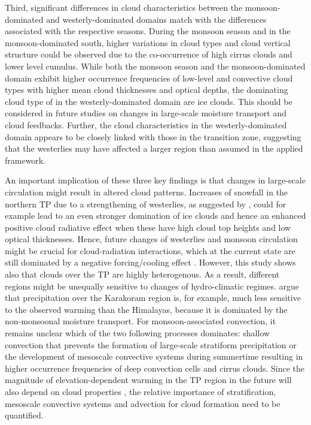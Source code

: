 \documentclass[alpha-refs]{wiley-article}
\begin{document}
Third, significant differences in cloud characteristics between the monsoon-dominated and westerly-dominated domains match with the differences associated with the respective seasons. During the monsoon season and in the monsoon-dominated south, higher variations in cloud types and cloud vertical structure could be observed due to the co-occurrence of high cirrus clouds and lower level cumulus. While both the monsoon season and the monsoon-dominated domain exhibit higher occurrence frequencies of low-level and convective cloud types with higher mean cloud thicknesses and optical depths, the dominating cloud type of in the westerly-dominated domain are ice clouds. This should be considered in future studies on changes in large-scale moisture transport and cloud feedbacks. Further, the cloud characteristics in the westerly-dominated domain appears to be closely linked with those in the transition zone, suggesting that the westerlies may have affected a larger region than assumed in the applied framework. 


An important implication of these three key findings is that changes in large-scale circulation might result in altered cloud patterns. Increases of snowfall in the northern TP due to a strengthening of westerlies, as suggested by \citet{c17}, could for example lead to an even stronger domination of ice clouds and hence an enhanced positive cloud radiative effect when these have high cloud top heights and low optical thicknesses.
Hence, future changes of westerlies and monsoon circulation might be crucial for cloud-radiation interactions, which at the current state are still dominated by a negative forcing/cooling effect \citep{cu16_2}. 
However, this study shows also that clouds over the TP are highly heterogenous. As a result, different regions might be unequally sensitive to changes of hydro-climatic regimes. \citet{karakoram2014snowfall} argue that precipitation over the Karakoram region is, for example, much less sensitive to the observed warming than the Himalayas, because it is dominated by the non-monsoonal moisture transport. For monsoon-associated convection, it remains unclear which of the two following processes dominates: shallow convection that prevents the formation of large-scale stratiform precipitation \citep{cu17_6} or the development of mesoscale convective systems during summertime \citep{cu08,cu16_4,cu17} resulting in higher occurrence frequencies of deep convection cells and cirrus clouds. Since the magnitude of elevation-dependent warming in the TP region in the future will also depend on cloud properties \citep{EDW2015}, the relative importance of stratification, mesoscale convective systems and advection for cloud formation need to be quantified. 
\end{document}
